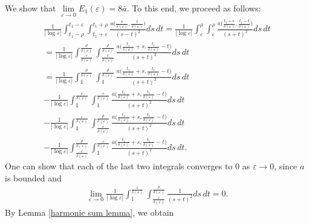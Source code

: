 \documentclass[12pt]{article}
\numberwithin{equation}{section}
\def\e{\varepsilon}
\begin{document}
We show that 
$\lim\limits_{\varepsilon\to0}E_{1}(\varepsilon)=8\bar{a}
$.
 To this end, we proceed as follows:
\begin{multline*}
    \frac{1}{|\log{\varepsilon}|}\int_{t_{1}-\rho}^{t_{1}-\varepsilon}\int_{t_{1}+\varepsilon}^{t_{1}+\rho}\frac{a\big(\frac{s}{\delta(\varepsilon)},\frac{t}{\delta(\varepsilon)}\big)}{(s-t)^{2}}ds\,dt=\frac{1}{|\log{\varepsilon}|}\int_{\varepsilon}^{\rho}\int_{\varepsilon}^{\rho}\frac{a\big(\frac{t_{1}+s}{\delta(\varepsilon)},\frac{t_{1}-t}{\delta(\varepsilon)}\big)}{(s+t)^{2}}ds\,dt\\=\frac{1}{|\log{\varepsilon}|}\int_{\frac{\varepsilon}{\delta(\varepsilon)}}^{\frac{\rho}{\delta(\varepsilon)}}\int_{\frac{\varepsilon}{\delta(\varepsilon)}}^{\frac{\rho}{\delta(\varepsilon)}}\frac{a\big(\frac{t_{1}}{\delta(\varepsilon)}+s,\frac{t_{1}}{\delta(\varepsilon)}-t\big)}{(s+t)^{2}}ds\,dt\\=\frac{1}{|\log{\varepsilon}|}\int_{1}^{\frac{\rho}{\delta(\varepsilon)}}\int_{1}^{\frac{\rho}{\delta(\varepsilon)}}\frac{a\big(\frac{t_{1}}{\delta(\varepsilon)}+s,\frac{t_{1}}{\delta(\varepsilon)}-t\big)}{(s+t)^{2}}ds\,dt
     \\
    -\frac{1}{|\log{\varepsilon}|}\int_{1}^{\frac{\varepsilon}{\delta(\varepsilon)}}\int_{1}^{\frac{\varepsilon}{\delta(\varepsilon)}}\frac{a\big(\frac{t_{1}}{\delta(\varepsilon)}+s,\frac{t_{1}}{\delta(\varepsilon)}-t\big)}{(s+t)^{2}}ds\,dt
    \\
    -\frac{1}{|\log{\varepsilon}|}\int_{1}^{\frac{\varepsilon}{\delta(\varepsilon)}}\int_{\frac{\varepsilon}{\delta(\varepsilon)}}^{\frac{\rho}{\delta(\varepsilon)}}\frac{a\big(\frac{t_{1}}{\delta(\varepsilon)}+s,\frac{t_{1}}{\delta(\varepsilon)}-t\big)}{(s+t)^{2}}
    ds\,dt
    \\
    -\frac{1}{|\log{\varepsilon}|}\int_{\frac{\varepsilon}{\delta(\varepsilon)}}^{\frac{\rho}{\delta(\varepsilon)}}\int_{1}^{\frac{\varepsilon}{\delta(\varepsilon)}}\frac{a\big(\frac{t_{1}}{\delta(\varepsilon)}+s,\frac{t_{1}}{\delta(\varepsilon)}-t\big)}{(s+t)^{2}}ds\,dt.
\end{multline*}
One can show that each of the last two integrals converges to $0$ as $\e\to0$, since $a$ is bounded and 
\begin{align*}
    \lim_{\varepsilon\to0}\frac{1}{|\log{\varepsilon}|}\int_{1}^{\frac{\varepsilon}{\delta(\varepsilon)}}\int_{\frac{\varepsilon}{\delta(\varepsilon)}}^{\frac{\rho}{\delta(\varepsilon)}}\frac{1}{(s+t)^{2}}ds\,dt=0.
\end{align*}
 By Lemma \ref{harmonic sum lemma}, we obtain
\end{document}
